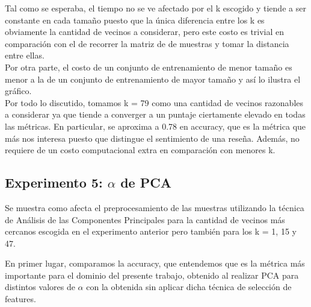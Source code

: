 Tal como se esperaba, el tiempo no se ve afectado por el k escogido y tiende a ser constante en cada tamaño puesto que la única diferencia entre los k es obviamente la cantidad de vecinos a considerar, pero este costo es trivial en comparación con el de recorrer la matriz de de muestras y tomar la distancia entre ellas. \\
Por otra parte, el costo de un conjunto de entrenamiento de menor tamaño es menor a la de un conjunto de entrenamiento de mayor tamaño y así lo ilustra el gráfico. \\

Por todo lo discutido, tomamos k = 79 como una cantidad de vecinos razonables a considerar ya que tiende a converger a un puntaje ciertamente elevado en todas las métricas. En particular, se aproxima a 0.78 en accuracy, que es la métrica que más nos interesa puesto que distingue el sentimiento de una reseña. 
Además, no requiere de un costo computacional extra en comparación con menores k. \\


\newpage
\subsection{Experimento 5: $\alpha$ de PCA}

Se muestra como afecta el preprocesamiento de las muestras utilizando la técnica de Análisis de las Componentes Principales para la cantidad de vecinos más cercanos escogida en el experimento anterior pero también para los k = 1, 15 y 47.

En primer lugar, comparamos la accuracy, que entendemos que es la métrica más importante para el dominio del presente trabajo, obtenido al realizar PCA para distintos valores de $\alpha$ con la obtenida sin aplicar dicha técnica de selección de features. 


